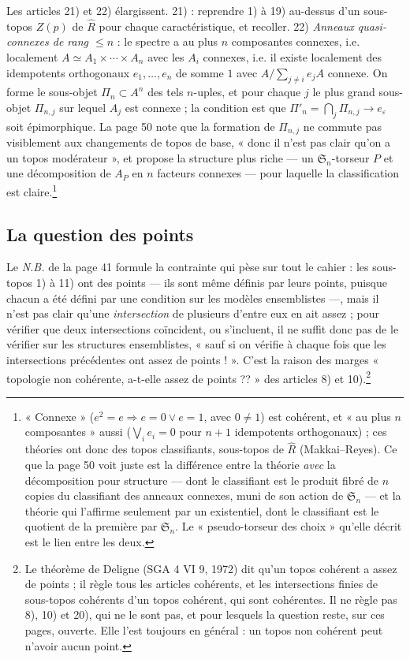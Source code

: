 \documentclass[11pt,a4paper]{article}
\begin{document}
Les articles 21) et 22) élargissent. 21) : reprendre 1) à 19) au-dessus
d'un sous-topos $Z(p)$ de $\widehat{R}$ pour chaque caractéristique, et
recoller. 22) \emph{Anneaux quasi-connexes de rang $\leqslant n$} : le
spectre a au plus $n$ composantes connexes, i.e. localement $A \simeq A_{1}
\times \cdots \times A_{n}$ avec les $A_{i}$ connexes, i.e. il existe
localement des idempotents orthogonaux $e_{1}, \ldots, e_{n}$ de somme $1$
avec $A/\sum_{j \neq i} e_{j}A$ connexe. On forme le sous-objet $\Pi_{n}
\subset A^{n}$ des tels $n$-uples, et pour chaque $j$ le plus grand
sous-objet $\Pi_{n,j}$ sur lequel $A_{j}$ est connexe ; la condition est que
$\Pi'_{n} = \bigcap_{j} \Pi_{n,j} \to e_{\varepsilon}$ soit épimorphique. La
page 50 note que la formation de $\Pi_{n,j}$ ne commute pas visiblement aux
changements de topos de base, « donc il n'est pas clair qu'on a un topos
modérateur », et propose la structure plus riche — un $\mathfrak{S}_{n}$-torseur
$P$ et une décomposition de $A_{P}$ en $n$ facteurs connexes — pour
laquelle la classification est claire.\footnote{« Connexe » ($e^{2} = e
\Rightarrow e = 0 \vee e = 1$, avec $0 \neq 1$) est cohérent, et « au plus
$n$ composantes » aussi ($\bigvee_{i} e_{i} = 0$ pour $n+1$ idempotents
orthogonaux) ; ces théories ont donc des topos classifiants, sous-topos de
$\widehat{R}$ (Makkai--Reyes). Ce que la page 50 voit juste est la
différence entre la théorie \emph{avec} la décomposition pour structure —
dont le classifiant est le produit fibré de $n$ copies du classifiant des
anneaux connexes, muni de son action de $\mathfrak{S}_{n}$ — et la théorie
qui l'affirme seulement par un existentiel, dont le classifiant est le
quotient de la première par $\mathfrak{S}_{n}$. Le « pseudo-torseur des
choix » qu'elle décrit est le lien entre les deux.}

\subsection*{La question des points}

Le \emph{N.B.} de la page 41 formule la contrainte qui pèse sur tout le
cahier : les sous-topos 1) à 11) ont des points — ils sont même définis par
leurs points, puisque chacun a été défini par une condition sur les
modèles ensemblistes —, mais il n'est pas clair qu'une \emph{intersection}
de plusieurs d'entre eux en ait assez ; pour vérifier que deux
intersections coïncident, ou s'incluent, il ne suffit donc pas de le
vérifier sur les structures ensemblistes, « sauf si on vérifie à chaque
fois que les intersections précédentes ont assez de points ! ». C'est la
raison des marges « topologie non cohérente, a-t-elle assez de points ?? »
des articles 8) et 10).\footnote{Le théorème de Deligne (SGA 4 VI 9, 1972)
dit qu'un topos cohérent a assez de points ; il règle tous les articles
cohérents, et les intersections finies de sous-topos cohérents d'un topos
cohérent, qui sont cohérentes. Il ne règle pas 8), 10) et 20), qui ne le
sont pas, et pour lesquels la question reste, sur ces pages, ouverte.
Elle l'est toujours en général : un topos non cohérent peut n'avoir aucun
point.}
\end{document}
